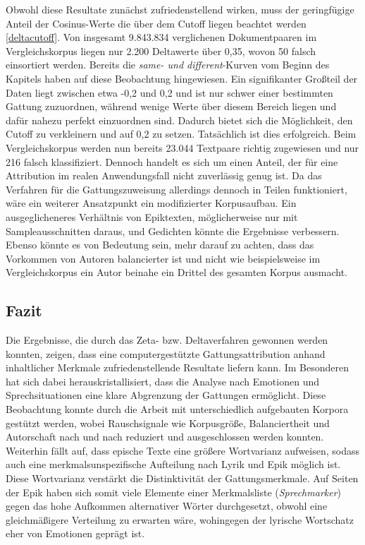 \documentclass[a4paper,10p]{article}
\begin{document}
Obwohl diese Resultate zunächst zufriedenstellend wirken, muss der geringfügige Anteil der Cosinus-Werte die über dem Cutoff liegen beachtet werden \ref{deltacutoff}. Von insgesamt 9.843.834 verglichenen Dokumentpaaren im Vergleichskorpus liegen nur 2.200 Deltawerte über 0,35, wovon 50 falsch einsortiert werden. Bereits die \textit{same- und different}-Kurven vom Beginn des Kapitels haben auf diese Beobachtung hingewiesen. Ein signifikanter Großteil der Daten liegt zwischen etwa -0,2 und 0,2 und ist nur schwer einer bestimmten Gattung zuzuordnen, während wenige Werte über diesem Bereich liegen und dafür nahezu perfekt einzuordnen sind. Dadurch bietet sich die Möglichkeit, den Cutoff zu verkleinern und auf 0,2 zu setzen. Tatsächlich ist dies erfolgreich. Beim Vergleichskorpus werden nun bereits 23.044 Textpaare richtig zugewiesen und nur 216 falsch klassifiziert. Dennoch handelt es sich um einen Anteil, der für eine Attribution im realen Anwendungsfall nicht zuverlässig genug ist. Da das Verfahren für die Gattungszuweisung allerdings dennoch in Teilen funktioniert, wäre ein weiterer Ansatzpunkt ein modifizierter Korpusaufbau. Ein ausgeglicheneres Verhältnis von Epiktexten, möglicherweise nur mit Sampleausschnitten daraus, und Gedichten könnte die Ergebnisse verbessern. Ebenso könnte es von Bedeutung sein, mehr darauf zu achten, dass das Vorkommen von Autoren balancierter ist und nicht wie beispielsweise im Vergleichskorpus ein Autor beinahe ein Drittel des gesamten Korpus ausmacht.



\subsection{Fazit}
Die Ergebnisse, die durch das Zeta- bzw. Deltaverfahren gewonnen werden konnten, zeigen, dass eine computergestützte Gattungsattribution anhand inhaltlicher Merkmale zufriedenstellende Resultate liefern kann. Im Besonderen hat sich dabei herauskristallisiert, dass die Analyse nach Emotionen und Sprechsituationen eine klare Abgrenzung der Gattungen ermöglicht. Diese Beobachtung konnte durch die Arbeit mit unterschiedlich aufgebauten Korpora gestützt werden, wobei Rauschsignale wie Korpusgröße, Balanciertheit und Autorschaft nach und nach reduziert und ausgeschlossen werden konnten. Weiterhin fällt auf, dass epische Texte eine größere Wortvarianz aufweisen, sodass auch eine merkmalsunspezifische Aufteilung nach Lyrik und Epik möglich ist. Diese Wortvarianz verstärkt die Distinktivität der Gattungsmerkmale. Auf Seiten der Epik haben sich somit viele Elemente einer Merkmalsliste (\textit{Sprechmarker}) gegen das hohe Aufkommen alternativer Wörter durchgesetzt, obwohl eine gleichmäßigere Verteilung zu erwarten wäre, wohingegen der lyrische Wortschatz eher von Emotionen geprägt ist. \par 
\end{document}
